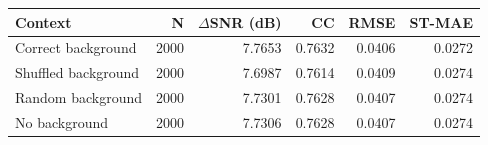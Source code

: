 \begin{tabular}{lrrrrr}
\toprule
Context & N & $\Delta$SNR (dB) & CC & RMSE & ST-MAE \\
\midrule
Correct background & 2000 & 7.7653 & 0.7632 & 0.0406 & 0.0272 \\
Shuffled background & 2000 & 7.6987 & 0.7614 & 0.0409 & 0.0274 \\
Random background & 2000 & 7.7301 & 0.7628 & 0.0407 & 0.0274 \\
No background & 2000 & 7.7306 & 0.7628 & 0.0407 & 0.0274 \\
\bottomrule
\end{tabular}
